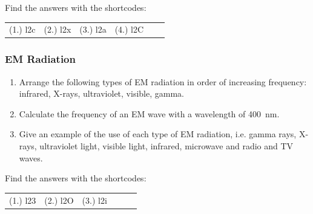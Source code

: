     \par
\label{m38778*secfhsst!!!underscore!!!id461}
\par {} Find the answers with the shortcodes:
 \par \begin{tabular}[h]{cccccc}
 (1.) l2c  &  (2.) l2x  &  (3.) l2a  &  (4.) l2C  & \end{tabular}
            \subsubsection{  EM Radiation }
            \nopagebreak
      \label{m38778*id188768}\begin{enumerate}[noitemsep, label=\textbf{\arabic*}. ] 
            \label{m38778*uid10}\item Arrange the following types of EM radiation in order of increasing frequency: infrared, X-rays, ultraviolet, visible, gamma.\newline
\label{m38778*uid11}\item Calculate the frequency of an EM wave with a wavelength of 400~nm.\newline
\label{m38778*uid12}\item Give an example of the use of each type of EM radiation, i.e. gamma rays, X-rays, ultraviolet light, visible light, infrared, microwave and radio and TV waves.\newline
\end{enumerate}
    \label{m38778*cid6}
\par {} Find the answers with the shortcodes:
 \par \begin{tabular}[h]{cccccc}
 (1.) l23  &  (2.) l2O  &  (3.) l2i  & \end{tabular}

